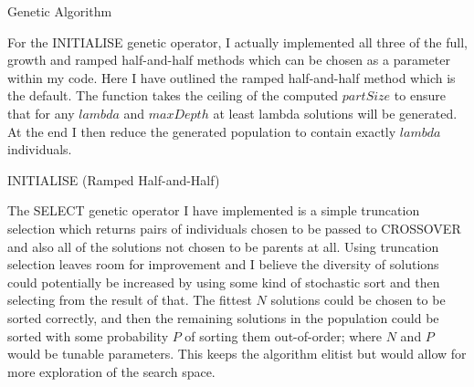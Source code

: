 \documentclass[11pt]{article}
\DeclarePairedDelimiter{\ceil}{\lceil}{\rceil}
\begin{document}
\begin{algorithm}[ht]
  \caption{Genetic Algorithm}
  \label{alg:ga}
  \DontPrintSemicolon
\end{algorithm}

For the INITIALISE genetic operator, I actually implemented all three of the full, growth and ramped half-and-half methods which can be chosen as a parameter within my code.
Here I have outlined the ramped half-and-half method which is the default.
The function takes the ceiling of the computed $partSize$ to ensure that for any $lambda$ and $maxDepth$ at least lambda solutions will be generated.
At the end I then reduce the generated population to contain exactly $lambda$ individuals.

\begin{algorithm}[ht]
  \caption{INITIALISE (Ramped Half-and-Half)}
  \label{alg:init}
  \DontPrintSemicolon
\end{algorithm}

The SELECT genetic operator I have implemented is a simple truncation selection which returns pairs of individuals chosen to be passed to CROSSOVER and also all of the solutions not chosen to be parents at all.
Using truncation selection leaves room for improvement and I believe the diversity of solutions could potentially be increased by using some kind of stochastic sort and then selecting from the result of that.
The fittest $N$ solutions could be chosen to be sorted correctly, and then the remaining solutions in the population could be sorted with some probability $P$ of sorting them out-of-order; where $N$ and $P$ would be tunable parameters.
This keeps the algorithm elitist but would allow for more exploration of the search space.
\end{document}
